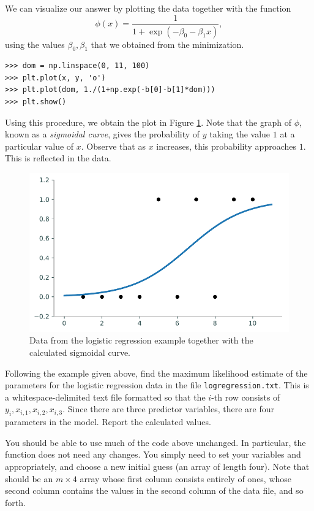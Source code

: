 We can visualize our answer by plotting the data together with the function
\[
\phi(x) = \frac{1}{1 + \exp(-\beta_0 - \beta_1x)},
\]
using the values $\beta_0, \beta_1$ that we obtained from the minimization.
\begin{lstlisting}
>>> dom = np.linspace(0, 11, 100)
>>> plt.plot(x, y, 'o')
>>> plt.plot(dom, 1./(1+np.exp(-b[0]-b[1]*dom)))
>>> plt.show()
\end{lstlisting}

Using this procedure, we obtain the plot in Figure \ref{fig:logistic_curve}.
Note that the graph of $\phi$, known as a \emph{sigmoidal curve},
gives the probability of $y$ taking the value $1$ at a particular value of $x$.
Observe that as $x$ increases, this probability approaches $1$.
This is reflected in the data.

\begin{figure}[H]
\centering
    \includegraphics[width=.6\textwidth]{figures/logreg.pdf}
    \caption{Data from the logistic regression example together with the calculated sigmoidal curve.}
    \label{fig:logistic_curve}
\end{figure}

\begin{problem}
Following the example given above, find the maximum likelihood estimate of the parameters for the logistic regression data in the file \texttt{logregression.txt}.
This is a whitespace-delimited text file formatted so that the $i$-th row consists of $y_i, x_{i,1}, x_{i,2}, x_{i,3}.$
Since there are three predictor variables, there are four parameters in the model.
Report the calculated values.

You should be able to use much of the code above unchanged.
In particular, the function  does not need any changes.
You simply need to set your variables  and  appropriately, and choose a new initial guess (an array of length four).
Note that  should be an $m \times 4$ array whose first column consists entirely of ones, whose second column contains the values in the second column of the data file, and so forth.
\end{problem}

